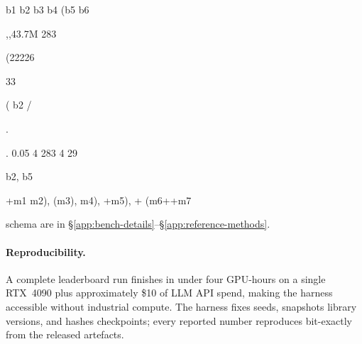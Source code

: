 







b1
b2
b3
b4
 (b5
b6







,,43.7M
283


(22226

33

(
b2
/

.






.
0.05 4
283
4
29

b2, b5





+m1
m2),
(m3), m4),
+m5), +
(m6++m7



schema are in \S\ref{app:bench-details}--\S\ref{app:reference-methods}.

\paragraph{Reproducibility.}
A complete leaderboard run finishes in under four GPU-hours on a
single RTX~4090 plus approximately \$10 of LLM API spend, making the
harness accessible without industrial compute. The harness fixes
seeds, snapshots library versions, and hashes checkpoints; every
reported number reproduces bit-exactly from the released
artefacts.
